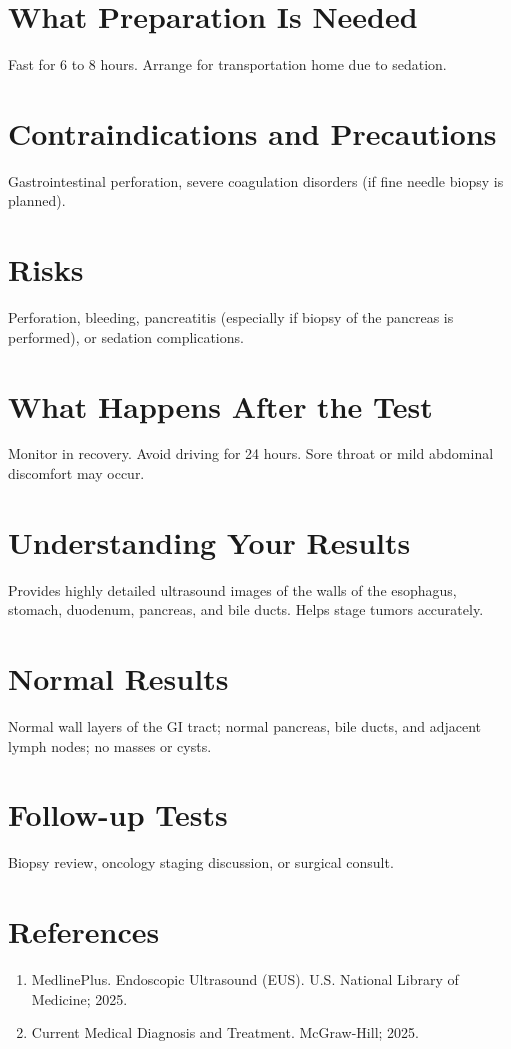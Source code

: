 \section*{What Preparation Is Needed}
Fast for 6 to 8 hours. Arrange for transportation home due to sedation.

\section*{Contraindications and Precautions}
Gastrointestinal perforation, severe coagulation disorders (if fine needle biopsy is planned).

\section*{Risks}
Perforation, bleeding, pancreatitis (especially if biopsy of the pancreas is performed), or sedation complications.

\section*{What Happens After the Test}
Monitor in recovery. Avoid driving for 24 hours. Sore throat or mild abdominal discomfort may occur.

\section*{Understanding Your Results}
Provides highly detailed ultrasound images of the walls of the esophagus, stomach, duodenum, pancreas, and bile ducts. Helps stage tumors accurately.

\section*{Normal Results}
Normal wall layers of the GI tract; normal pancreas, bile ducts, and adjacent lymph nodes; no masses or cysts.

\section*{Follow-up Tests}
Biopsy review, oncology staging discussion, or surgical consult.

\section*{References}
\begin{enumerate}
  \item MedlinePlus. Endoscopic Ultrasound (EUS). U.S. National Library of Medicine; 2025.
  \item Current Medical Diagnosis and Treatment. McGraw-Hill; 2025.
\end{enumerate}

\clearpage
